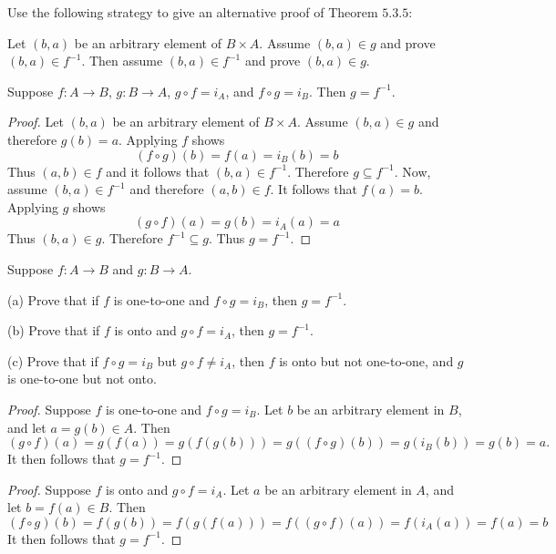 \begin{tcolorbox}[title=Problem 10, breakable]
    Use the following strategy to give an alternative proof  of Theorem $5.3.5$:
    
    Let $(b, a)$ be an arbitrary element of $B \times A$.
    Assume $(b, a) \in g$ and prove $(b, a) \in f^{-1}$.
    Then assume $(b, a) \in f^{-1}$ and prove $(b, a) \in g$.
\end{tcolorbox}

\begin{theorem}
    Suppose $f : A \rightarrow B$, $g : B \rightarrow A$, $g \circ f = i_A$,
        and $f \circ g = i_B$. Then $g = f^{-1}$.
\end{theorem}

\begin{proof}
    Let $(b, a)$ be an arbitrary element of $B \times A$.
    Assume $(b, a) \in g$ and therefore $g(b) = a$.
    Applying $f$ shows 
    \[(f \circ g)(b) = f(a) = i_B(b) = b\]
    Thus $(a, b) \in f$ and it follows that $(b, a) \in f^{-1}$.
    Therefore $g \subseteq f^{-1}$.
    Now, assume $(b, a) \in f^{-1}$ and therefore $(a, b) \in f$.
    It follows that $f(a) = b$.
    Applying $g$ shows 
    \[(g \circ f)(a) = g(b) = i_A(a) = a\]
    Thus $(b, a) \in g$.
    Therefore $f^{-1} \subseteq g$.
    Thus $g = f^{-1}$.
\end{proof}

\newpage
\begin{tcolorbox}[title=Problem 11, breakable]
    Suppose $f : A \rightarrow B$ and $g : B \rightarrow A$.

    (a) Prove that if $f$ is one-to-one and $f \circ g = i_B$, then $g = f^{-1}$.

    (b) Prove that if $f$ is onto and $g \circ f = i_A$, then $g = f^{-1}$.

    (c) Prove that if $f \circ g = i_B$ but $g \circ f \ne i_A$, then $f$ is onto 
        but not one-to-one, and $g$ is one-to-one but not onto.
\end{tcolorbox}

\begin{proof}
    Suppose $f$ is one-to-one and $f \circ g = i_B$.
    Let $b$ be an arbitrary element in $B$, and let $a = g(b) \in A$.
    Then
    \[
    (g \circ f)(a) = g(f(a)) = g(f(g(b))) = g((f \circ g)(b)) = g(i_B(b)) = g(b) = a.
    \]
    It then follows that $g = f^{-1}$.
\end{proof}

\begin{proof}
    Suppose $f$ is onto and $g \circ f = i_A$.
    Let $a$ be an arbitrary element in $A$, and 
        let $b = f(a) \in B$.
    Then 
    \[(f \circ g)(b) = f(g(b)) = f(g(f(a))) = f((g \circ f)(a)) = f(i_A(a)) = f(a) = b\]
    It then follows that $g = f^{-1}$.
\end{proof}

